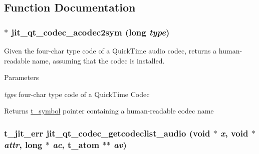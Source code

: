 \subsection{Function Documentation}
\hypertarget{group__qtcodecmod_ga7544a1595e0a1776dfce856056e8e7f8}{
\subsubsection[{jit\_\-qt\_\-codec\_\-acodec2sym}]{$\ast$ jit\_\-qt\_\-codec\_\-acodec2sym (long {\em type})}}
\label{group__qtcodecmod_ga7544a1595e0a1776dfce856056e8e7f8}


Given the four-\/char type code of a QuickTime audio codec, returns a human-\/readable name, assuming that the codec is installed. 
\begin{DoxyParams}{Parameters}
\item[{\em type}]four-\/char type code of a QuickTime Codec\end{DoxyParams}
\begin{DoxyReturn}{Returns}
\hyperlink{structt__symbol}{t\_\-symbol} pointer containing a human-\/readable codec name 
\end{DoxyReturn}
\hypertarget{group__qtcodecmod_ga9bfde35355bacbb2c426c35d2366b81a}{
\subsubsection[{jit\_\-qt\_\-codec\_\-getcodeclist\_\-audio}]{\setlength{\rightskip}{0pt plus 5cm}t\_\-jit\_\-err jit\_\-qt\_\-codec\_\-getcodeclist\_\-audio (void $\ast$ {\em x}, \/  void $\ast$ {\em attr}, \/  long $\ast$ {\em ac}, \/  {\bf t\_\-atom} $\ast$$\ast$ {\em av})}}
\label{group__qtcodecmod_ga9bfde35355bacbb2c426c35d2366b81a}


